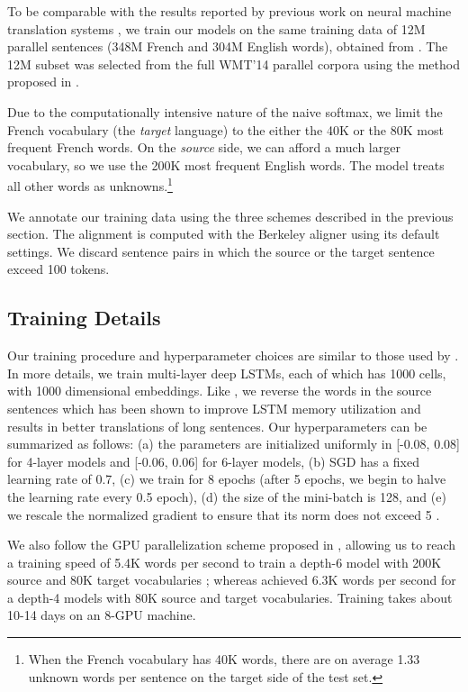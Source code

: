 \documentclass[11pt]{article}
\begin{document}
To be comparable with the results reported by previous work on neural machine translation systems
\cite{sutskever14,cho14,bog15}, we train our models on 
the same training data of 12M parallel sentences (348M French and 304M English words), obtained from \cite{wmt14_en_fr}. 
The 12M subset was selected 
from the full WMT'14 parallel corpora using the method proposed in .

Due to the computationally intensive nature of the naive softmax,
we limit the French vocabulary (the {\it target} language) 
to the either the 40K or the 80K most frequent French words. On the {\it source} side, 
we can afford a much larger vocabulary, so we use the 200K most frequent English words. 
The model treats all other words as unknowns.\footnote{When the French vocabulary has 40K words, there are
on average 1.33 unknown words per sentence on the target side of the test set.}

We annotate our training data using the three schemes described in the previous section. The alignment 
is computed with the Berkeley aligner \cite{liang06alignment} using its default settings.
We discard sentence pairs in which the source or the target sentence exceed 100 tokens.

\subsection{Training Details}
\label{subsec:train_details}
Our training procedure and hyperparameter choices are similar to those used by
. In more details, we train multi-layer deep LSTMs, each of which has 
1000 cells, with 1000 dimensional embeddings. Like , 
we reverse the words in the source sentences which 
has been shown to improve LSTM memory utilization and results in better translations of long sentences. 
Our hyperparameters can be summarized as follows: (a) the parameters are initialized uniformly  
in [-0.08, 0.08] for 4-layer models and [-0.06, 0.06] for 6-layer models, (b) SGD has a fixed learning rate of 0.7, (c) we train for 8 epochs (after
5 epochs, we begin to halve the learning rate every 0.5 epoch), (d) the size of the mini-batch is 128, 
and (e) we rescale the normalized gradient to ensure that its norm does not exceed 5 \cite{razvan}.

We also follow the GPU parallelization scheme proposed in \cite{sutskever14}, allowing us to  
reach a training speed of 5.4K words per second to train a depth-6 model with 200K source and 80K target vocabularies  
; whereas  achieved 6.3K words per 
second for a depth-4 models with 80K source and target vocabularies.
Training takes about 10-14 days on an 8-GPU machine.
\end{document}
